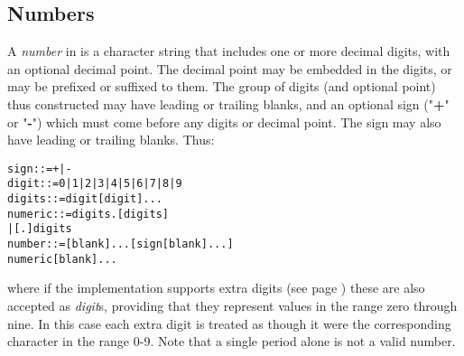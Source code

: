 \subsection{Numbers}\label{refdefnum}
 A \emph{number} in \nr{} is a character string that includes one or
more decimal digits, with an optional decimal point.
The decimal point may be embedded in the digits, or may be prefixed or
suffixed to them.
The group of digits (and optional point) thus constructed may have
leading or trailing blanks, and an optional sign ("\textbf{+}"
or "\textbf{-}") which must come before any digits or decimal
point.
The sign may also have leading or trailing blanks.
Thus:
\begin{alltt}
sign    ::=  + | -
digit   ::=  0 | 1 | 2 | 3 | 4 | 5 | 6 | 7 | 8 | 9
digits  ::=  digit [digit]...
numeric ::=  digits . [digits]
             | [.] digits
number  ::=  [blank]... [sign [blank]...]
             numeric [blank]...
\end{alltt}

where if the implementation supports  extra digits (see page \pageref{refsyms}) 
these are also accepted as \emph{digit}s, providing that they
represent values in the range zero through nine.
In this case each extra digit is treated as though it were
the corresponding character in the range 0-9.
 Note that a single period alone is not a valid number.
